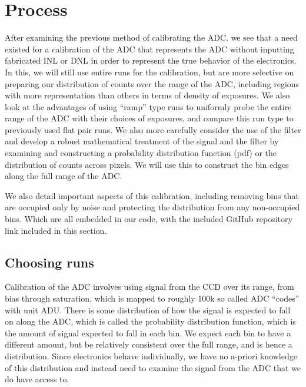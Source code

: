 \documentclass[11pt, letterpaper]{article}
\begin{document}
\section{Process}
\indent


After examining the previous method of calibrating the ADC, we see that a need existed for a calibration of the ADC that represents the ADC without inputting fabricated INL or DNL in order to represent the true behavior of the electronics. 
In this, we will still use entire runs for the calibration, but are more selective on preparing our distribution of counts over the range of the ADC, including regions with more representation than others in terms of density of exposures. 
We also look at the advantages of using “ramp” type runs to uniformly probe the entire range of the ADC with their choices of exposures, and compare this run type to previously used flat pair runs.
We also more carefully consider the use of the filter and develop a robust mathematical treatment of the signal and the filter by examining and constructing a probability distribution function (pdf) or the distribution of counts across pixels.  
We will use this to construct the bin edges along the full range of the ADC. 
\indent 


We also detail important aspects of this calibration, including removing bins that are occupied only by noise and protecting the distribution from any non-occupied bins. 
Which are all embedded in our code, with the included GitHub repository link included in this section. 

\subsection{Choosing runs}
\indent


Calibration of the ADC involves using signal from the CCD over its range, from bias through saturation, which is mapped to roughly 100k so called ADC “codes” with unit ADU. 
There is some distribution of how the signal is expected to fall on along the ADC, which is called the probability distribution function, which is the amount of signal expected to fall in each bin. 
We expect each bin to have a different amount, but be relatively consistent over the full range, and is hence a distribution. 
Since electronics behave individually, we have no a-priori knowledge of this distribution and instead need to examine the signal from the ADC that we do have access to. 
\indent 
\end{document}

